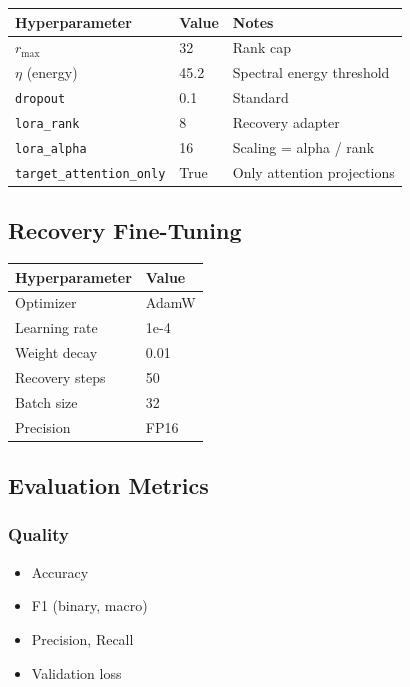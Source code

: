 \begin{table}[H]
\centering
\small
\begin{tabular}{lll}
\toprule
\textbf{Hyperparameter} & \textbf{Value} & \textbf{Notes} \\
\midrule
$r_\text{max}$ & 32 & Rank cap \\
$\eta$ (energy) & 45.2 & Spectral energy threshold \\
\texttt{dropout} & 0.1 & Standard \\
\texttt{lora\_rank} & 8 & Recovery adapter \\
\texttt{lora\_alpha} & 16 & Scaling = alpha / rank \\
\texttt{target\_attention\_only} & True & Only attention projections \\
\bottomrule
\end{tabular}
\end{table}

\subsection{Recovery Fine-Tuning}

\begin{table}[H]
\centering
\small
\begin{tabular}{ll}
\toprule
\textbf{Hyperparameter} & \textbf{Value} \\
\midrule
Optimizer & AdamW \\
Learning rate & 1e-4 \\
Weight decay & 0.01 \\
Recovery steps & 50 \\
Batch size & 32 \\
Precision & FP16 \\
\bottomrule
\end{tabular}
\end{table}

\subsection{Evaluation Metrics}

\subsubsection{Quality}

\begin{itemize}
\item Accuracy
\item F1 (binary, macro)
\item Precision, Recall
\item Validation loss

\end{itemize}
